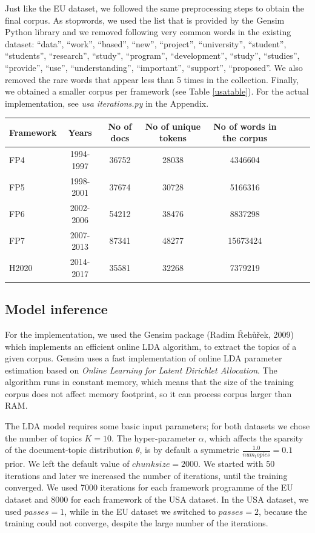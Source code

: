 \documentclass[12pt]{report}
\begin{document}
Just like the EU dataset, we followed the same preprocessing steps to obtain the
final corpus. As stopwords, we used the list that is provided by the Gensim
Python library and we removed following very common words in the existing
dataset: ``data'', ``work'', ``based'', ``new'', ``project'', ``university'', ``student'', ``students'', ``research'', ``study'', ``program'', ``development'', ``study'', ``studies'', ``provide'', ``use'', ``understanding'', ``important'', ``support'', ``proposed''. We also removed the rare words that appear less than 5 
times in the collection. Finally, we obtained a smaller corpus per framework 
(see Table \ref{usatable}). 
For the actual implementation, see \emph{usa iterations.py} in the Appendix.

\begin{center}
\begin{tabular}{l*{6}{c}r}
Framework& Years & No of docs & No of unique tokens & No of words in the corpus \\
\hline
FP4 & 1994-1997 & 36752 & 28038 & 4346604 \\
FP5 & 1998-2001 & 37674 & 30728 & 5166316 \\
FP6 & 2002-2006 & 54212 & 38476 & 8837298 \\
FP7 & 2007-2013 & 87341 & 48277 & 15673424 \\
H2020 & 2014-2017 & 35581 & 32268 & 7379219 \\
\end{tabular}
\label{usatable}
\end{center}

\subsection{Model inference}
\label{modelinference}
For the implementation, we used the Gensim package (Radim Řehůřek,
2009)\cite{rehurek_lrec} which implements an efficient online LDA algorithm, to
extract the topics of a given corpus. Gensim uses a fast implementation of
online LDA parameter estimation based on \emph{Online Learning for Latent Dirichlet
Allocation}.\cite{onlineLDAvb} The algorithm runs in constant memory, which
means that the size of the training corpus does not affect memory footprint, so
it can process corpus larger than RAM.

The LDA model requires some basic input parameters; for both datasets we chose
the number of topics $K=10$. The hyper-parameter $\alpha$, which affects the
sparsity of the document-topic distribution $\theta$, is by default a symmetric
$\frac{1.0}{num_topics} = 0.1$ prior. We left the default value of $chunksize=2000$. We
started with 50 iterations and later we increased the number of iterations,
until the training converged. We used 7000 iterations for each framework
programme of the EU dataset and 8000 for each framework of the USA dataset. In
the USA dataset, we used $passes=1$, while in the EU dataset we switched to
$passes=2$, because the training could not converge, despite the large number of
the iterations.
\end{document}
